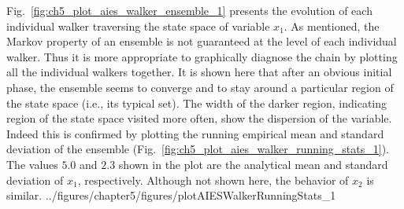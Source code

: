 Fig.~\ref{fig:ch5_plot_aies_walker_ensemble_1} presents the evolution of each individual walker traversing the state space of variable $x_1$.
As mentioned, the Markov property of an ensemble is not guaranteed at the level of each individual walker.
Thus it is more appropriate to graphically diagnose the chain by plotting all the individual walkers together.
It is shown here that after an obvious initial phase,
the ensemble seems to converge and to stay around a particular region of the state space (i.e., its typical set).
The width of the darker region, indicating region of the state space visited more often,
show the dispersion of the variable. 
Indeed this is confirmed by plotting the running empirical mean and standard deviation of the ensemble (Fig.~\ref{fig:ch5_plot_aies_walker_running_stats_1}).
The values $5.0$ and $2.3$ shown in the plot are the analytical mean and standard deviation of $x_1$, respectively.
Although not shown here, the behavior of $x_2$ is similar.
{../figures/chapter5/figures/plotAIESWalkerRunningStats_1}


